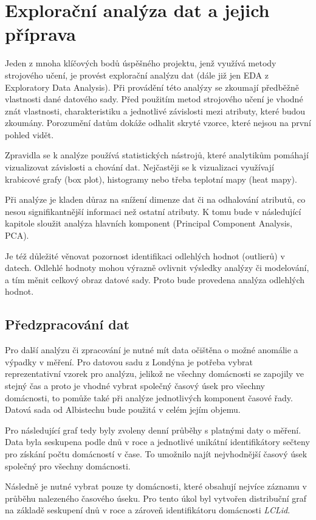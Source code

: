 \documentclass[FM,BP,fonts]{tulthesis}
\begin{document}
\section{Explorační analýza dat a jejich příprava}
Jeden z mnoha klíčových bodů úspěšného projektu, jenž využívá metody strojového učení, je provést explorační analýzu dat (dále již jen EDA z Exploratory Data Analysis). Při provádění této analýzy se zkoumají předběžně vlastnosti dané datového sady. Před použitím metod strojového učení je vhodné znát vlastnosti, charakteristiku a jednotlivé závislosti mezi atributy, které budou zkoumány. Porozumění datům dokáže odhalit skryté vzorce, které nejsou na první pohled vidět.

Zpravidla se k analýze používá statistických nástrojů, které analytikům pomáhají vizualizovat závislosti a chování dat. Nejčastěji se k vizualizaci využívají krabicové grafy (box plot), histogramy nebo třeba teplotní mapy (heat mapy). 

Při analýze je kladen důraz na snížení dimenze dat či na odhalování atributů, co nesou signifikantnější informaci než ostatní atributy. K tomu bude v následující kapitole sloužit analýza hlavních komponent (Principal Component Analysis, PCA). 

Je též důležité věnovat pozornost identifikaci odlehlých hodnot (outlierů) v datech. Odlehlé hodnoty mohou výrazně ovlivnit výsledky analýzy či modelování, a tím měnit celkový obraz datové sady. Proto bude provedena analýza odlehlých hodnot.


\subsection{Předzpracování dat}\label{preprocess}
Pro další analýzu či zpracování je nutné mít data očištěna o možné anomálie a výpadky v měření. Pro datovou sadu z Londýna je potřeba vybrat reprezentativní vzorek pro analýzu, jelikož ne všechny domácnosti se zapojily ve stejný čas a proto je vhodné vybrat společný časový úsek pro všechny domácnosti, to pomůže také při analýze jednotlivých komponent časové řady. Datová sada od Albistechu bude použitá v celém jejím objemu. 

Pro následující graf tedy byly zvoleny denní průběhy s platnými daty o měření. Data byla seskupena podle dnů v roce a jednotlivé unikátní identifikátory sečteny pro získání počtu domácností v čase. To umožnilo najít nejvhodnější časový úsek společný pro všechny domácnosti.

Následně je nutné vybrat pouze ty domácnosti, které obsahují nejvíce záznamu v průběhu nalezeného časového úseku. Pro tento úkol byl vytvořen distribuční graf na základě seskupení dnů v roce a zároveň identifikátoru domácnosti \textit{LCLid}.
\end{document}
